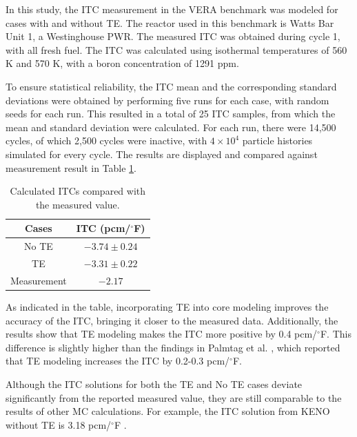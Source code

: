 In this study, the ITC measurement in the VERA benchmark was modeled for cases with and without TE. The reactor used in this benchmark is Watts Bar Unit 1, a Westinghouse PWR. The measured ITC was obtained during cycle 1, with all fresh fuel. The ITC was calculated using isothermal temperatures of 560 K and 570 K, with a boron concentration of 1291 ppm. 

To ensure statistical reliability, the ITC mean and the corresponding standard deviations were obtained by performing five runs for each case, with random seeds for each run. This resulted in a total of 25 ITC samples, from which the mean and standard deviation were calculated. For each run, there were 14,500 cycles, of which 2,500 cycles were inactive, with $4\times10^4$ particle histories simulated for every cycle. The results are displayed and compared against measurement result in Table \ref{tab424}.


\begin{table}
    \centering
    \caption{Calculated ITCs compared with the measured value.}
    \label{tab424} 
    \begin{tabular}{| c | c |}
    \hline 
    Cases & ITC (pcm/$^{\circ}$F) \\
     \hline
     No TE                & $-3.74 \pm 0.24 $    \\ \hline
     TE                   & $-3.31 \pm 0.22 $    \\ \hline
     Measurement          & $-2.17 $    \\ \hline
    \end{tabular}
\end{table}

As indicated in the table, incorporating TE into core modeling improves the accuracy of the ITC, bringing it closer to the measured data. Additionally, the results show that TE modeling makes the ITC more positive by 0.4 pcm/$^{\circ}$F. This difference is slightly higher than the findings in Palmtag et al. \cite{palmtag}, which reported that TE modeling increases the ITC by 0.2-0.3 pcm/$^{\circ}$F.

Although the ITC solutions for both the TE and No TE cases deviate significantly from the reported measured value, they are still comparable to the results of other MC calculations. For example, the ITC solution from KENO without TE is 3.18 pcm/$^{\circ}$F \cite{godfrey}.

